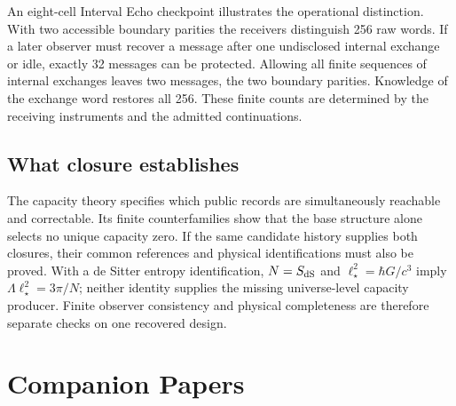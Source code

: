 \documentclass[11pt]{article}
\begin{document}


An eight-cell Interval Echo checkpoint illustrates the operational distinction.
With two accessible boundary parities the receivers distinguish 256 raw
words. If a later observer must recover a message after one undisclosed
internal exchange or idle, exactly 32 messages can be protected. Allowing
all finite sequences of internal exchanges leaves two messages, the two
boundary parities. Knowledge of the exchange word restores all 256. These
finite counts are determined by the receiving instruments and the admitted
continuations\cite{ophmicrophysics}.

\subsection{What closure establishes}
The capacity theory specifies which public records are simultaneously
reachable and correctable. Its finite counterfamilies show that the base
structure alone selects no unique capacity zero. If the same candidate
history supplies both closures, their common references and physical
identifications must also be proved. With a de Sitter entropy identification,
$N=S_{\rm dS}$ and $\ell_\star^2=\hbar G/c^3$ imply
$\Lambda\ell_\star^2=3\pi/N$; neither identity supplies the missing
universe-level capacity producer. Finite observer consistency and physical
completeness are therefore separate checks on one recovered design.




\section*{Companion Papers}
\end{document}
